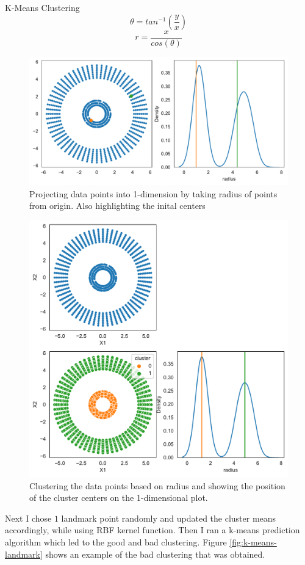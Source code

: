 \documentclass[a4paper,11pt]{article}
\begin{document}
\begin{mlsolution}
\begin{section}{K-Means Clustering}
        \begin{equation}
            \label{eq:angle-calc}
            \theta = tan^{-1}\left( \frac{y}{x} \right)
        \end{equation}
        \begin{equation}
            \label{eq:radius-calc}
            r = \frac{x}{cos(\theta)}
        \end{equation}

        \begin{figure}[h]
            \centering
            \includegraphics[width=.5\textwidth]{images/k-means-with-radius-projection.pdf}
            \caption{Projecting data points into 1-dimension by taking radius of points from origin. Also highlighting the inital centers}
            \label{fig:k-means-with-radius-projection}
        \end{figure}

        \begin{figure}[h]
            \centering
            \includegraphics[width=.5\textwidth]{images/k-means-clustered-with-radius-projection.pdf}
            \caption{Clustering the data points based on radius and showing the position of the cluster centers on the 1-dimensional plot.}
            \label{fig:k-means-clustered-with-radius-projection}
        \end{figure}

        Next I chose $1$ landmark point randomly and updated the cluster means accordingly, while using RBF kernel function. Then I ran a k-means prediction algorithm which led to the good and bad clustering. Figure \ref{fig:k-means-landmark} shows an example of the bad clustering that was obtained.


\end{section}
\end{mlsolution}
\end{document}
